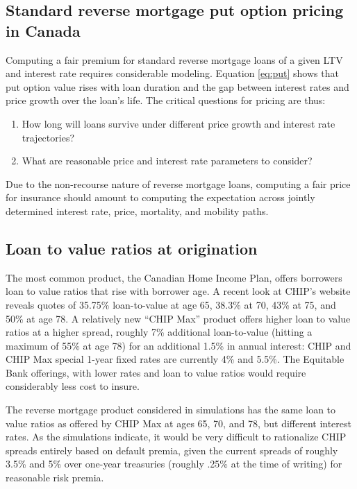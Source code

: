 \documentclass[12pt]{article}
\begin{document}
\subsection{Standard reverse mortgage put option pricing in Canada}

Computing a fair premium for standard reverse mortgage loans of a given LTV and
interest rate requires considerable modeling. Equation \eqref{eq:put} shows
that put option value rises with loan duration and the gap between interest
rates and price growth over the loan's life. The critical questions
for pricing are thus: 

\begin{enumerate}
	\item How long will loans survive under different price growth and interest rate trajectories? 
	\item What are reasonable price and interest rate parameters to consider?
\end{enumerate}

Due to the non-recourse nature of reverse mortgage loans, computing a fair
price for insurance should amount to computing the expectation across jointly
determined interest rate, price, mortality, and mobility paths.

\subsection{Loan to value ratios at origination}

The most common product, the Canadian Home Income Plan, offers borrowers loan
to value ratios that rise with borrower age. A recent look at CHIP's website
reveals quotes of 35.75\% loan-to-value at age 65, 38.3\% at 70, 43\% at 75,
and 50\% at age 78. A relatively new ``CHIP Max'' product offers higher loan to
value ratios at a higher spread, roughly 7\% additional loan-to-value (hitting
a maximum of 55\% at age 78) for an additional 1.5\% in annual interest: CHIP
and CHIP Max special 1-year fixed rates are currently 4\% and 5.5\%. The
Equitable Bank offerings, with lower rates and loan to value ratios would
require considerably less cost to insure.

The reverse mortgage product considered in simulations has the same loan to
value ratios as offered by CHIP Max at ages 65, 70, and 78, but different
interest rates. As the simulations indicate, it would be very difficult to
rationalize CHIP spreads entirely based on default premia, given the current
spreads of roughly 3.5\% and 5\% over one-year treasuries (roughly .25\% at the
time of writing) for reasonable risk premia.    
\end{document}
